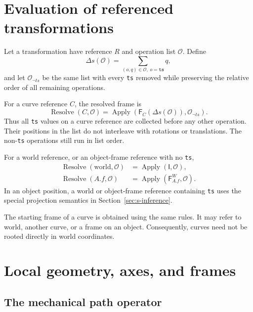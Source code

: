 \documentclass[11pt,a4paper]{article}
\newcommand{\Frame}{\mathsf{F}}
\newcommand{\Apply}{\operatorname{Apply}}
\newcommand{\ops}{\mathcal{O}}
\newcommand{\identity}{\mathsf{I}}
\begin{document}
\section{Evaluation of referenced transformations}
\label{sec:reference-transform}

Let a transformation have reference $R$ and operation list $\ops$.  Define
\begin{equation}
  \Delta s(\ops)=\sum_{(o,q)\in\ops,\;o=\texttt{ts}}q,
\end{equation}
and let $\ops_{\neg ts}$ be the same list with every \texttt{ts} removed while
preserving the relative order of all remaining operations.

For a curve reference $C$, the resolved frame is
\begin{equation}
  \operatorname{Resolve}(C,\ops)
  =\Apply\!\left(\Frame_C(\Delta s(\ops)),\ops_{\neg ts}\right).
  \label{eq:curve-reference}
\end{equation}
Thus all \texttt{ts} values on a curve reference are collected before any
other operation.  Their positions in the list do not interleave with rotations
or translations.  The non-\texttt{ts} operations still run in list order.

For a world reference, or an object-frame reference with no \texttt{ts},
\begin{align}
  \operatorname{Resolve}(\text{world},\ops)
    &=\Apply(\identity,\ops),\\
  \operatorname{Resolve}(A.f,\ops)
    &=\Apply(\Frame_{A.f}^{W},\ops).
  \label{eq:ordinary-reference}
\end{align}
In an object position, a world or object-frame reference containing \texttt{ts} uses the special projection
semantics in Section~\ref{sec:s-inference}.

The starting frame of a curve is obtained using the same rules.  It may refer
to world, another curve, or a frame on an object.  Consequently, curves need
not be rooted directly in world coordinates.

\section{Local geometry, axes, and frames}
\label{sec:type-local}

\subsection{The mechanical path operator}
\end{document}
